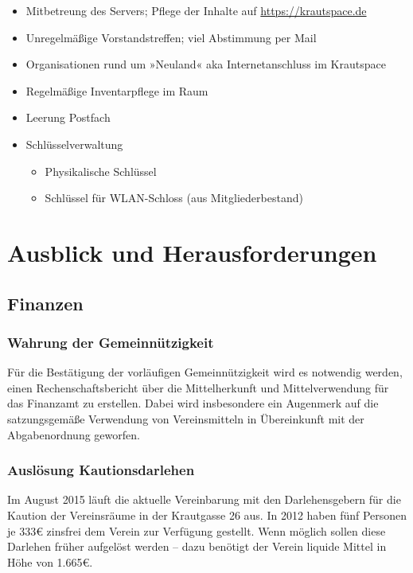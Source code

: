 \documentclass[10pt,DIV16]{scrartcl}
\begin{document}
\begin{itemize}
\begin{itemize}
		\end{itemize}
	\item Mitbetreung des Servers; Pflege der Inhalte auf \url{https://krautspace.de}
	\item Unregelmäßige Vorstandstreffen; viel Abstimmung per Mail
	\item Organisationen rund um »Neuland« aka Internetanschluss im Krautspace
	\item Regelmäßige Inventarpflege im Raum
	\item Leerung Postfach
	\item Schlüsselverwaltung
		\begin{itemize}
			\item Physikalische Schlüssel
			\item Schlüssel für WLAN-Schloss (aus Mitgliederbestand)
		\end{itemize}
\end{itemize}

\section{Ausblick und Herausforderungen}

\subsection{Finanzen}
\label{sec:ausblick:finanzen}

\subsubsection{Wahrung der Gemeinnützigkeit}

Für die Bestätigung der vorläufigen Gemeinnützigkeit wird es notwendig
werden, einen Rechenschaftsbericht über die Mittelherkunft und
Mittelverwendung für das Finanzamt zu erstellen. Dabei wird
insbesondere ein Augenmerk auf die satzungsgemäße Verwendung von
Vereinsmitteln in Übereinkunft mit der Abgabenordnung geworfen.

\subsubsection{Auslösung Kautionsdarlehen}
\label{sec:katrionsdarlehen}

Im August 2015 läuft die aktuelle Vereinbarung mit den Darlehensgebern
für die Kaution der Vereinsräume in der Krautgasse 26 aus. In 2012
haben fünf Personen je 333\euro{} zinsfrei dem Verein zur Verfügung gestellt.
Wenn möglich sollen diese Darlehen früher aufgelöst werden -- dazu
benötigt der Verein liquide Mittel in Höhe von 1.665\euro{}.
\end{document}
